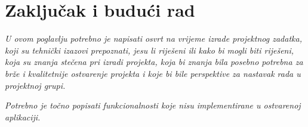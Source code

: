 \chapter{Zaključak i budući rad}

\textit{U ovom poglavlju potrebno je napisati osvrt na vrijeme izrade projektnog zadatka, koji su tehnički 
izazovi prepoznati, jesu li riješeni ili kako bi mogli biti riješeni, koja su znanja stečena pri izradi projekta, 
koja bi znanja bila posebno potrebna za brže i kvalitetnije ostvarenje projekta 
i koje bi bile perspektive za nastavak rada u projektnoj grupi.}



\textit{Potrebno je točno popisati funkcionalnosti koje nisu implementirane u ostvarenoj aplikaciji.}

\eject